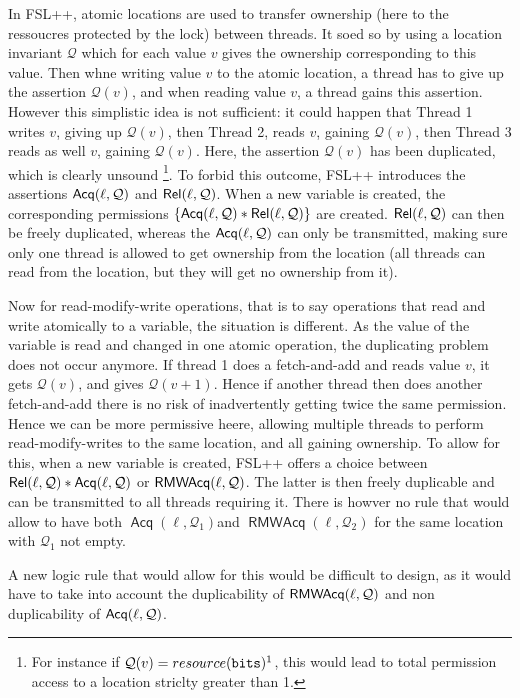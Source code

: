 In FSL++, atomic locations are used to transfer ownership (here to the ressoucres protected by the lock) between threads. It soed so by using a location invariant $\mathcal{Q}$ which for each value $v$ gives the ownership corresponding to this value. Then whne writing value $v$ to the atomic location, a thread has to give up the assertion $\mathcal{Q}(v)$, and when reading value $v$, a thread gains this assertion. However this simplistic idea is not sufficient: it could happen that Thread 1 writes $v$, giving up $\mathcal{Q}(v)$, then Thread 2, reads $v$, gaining $\mathcal{Q}(v)$, then Thread 3 reads as well $v$, gaining $\mathcal{Q}(v)$. Here, the assertion $\mathcal{Q}(v)$ has been duplicated, which is clearly unsound \footnote{For instance if $\mathcal{Q}(v) = resource(\texttt{bits})^{1}$, this would lead to total permission access to a location striclty greater than 1.}. To forbid this outcome, FSL++ introduces the assertions $\operatorname{\mathsf{Acq}}(\ell, \mathcal{Q})$ and $\operatorname{\mathsf{Rel}}(\ell, \mathcal{Q})$. When a new variable is created, the corresponding permissions $\{\operatorname{\mathsf{Acq}}(\ell, \mathcal{Q}) * \operatorname{\mathsf{Rel}}(\ell, \mathcal{Q})\}$ are created. $\operatorname{\mathsf{Rel}}(\ell, \mathcal{Q})$ can then be freely duplicated, whereas the $\operatorname{\mathsf{Acq}}(\ell, \mathcal{Q})$ can only be transmitted, making sure only one thread is allowed to get ownership from the location (all threads can read from the location, but they will get no ownership from it). 

Now for read-modify-write operations, that is to say operations that read and write atomically to a variable, the situation is different. As the value of the variable is read and changed in one atomic operation, the duplicating problem does not occur anymore. If thread 1 does a fetch-and-add and reads value $v$, it gets $\mathcal{Q}(v)$, and gives $\mathcal{Q}(v + 1)$. Hence if another thread then does another fetch-and-add there is no risk of inadvertently getting twice the same permission. Hence we can be more permissive heere, allowing multiple threads to perform read-modify-writes to the same location, and all gaining ownership. To allow for this, when a new variable is created, FSL++ offers a choice between $\operatorname{\mathsf{Rel}}(\ell, \mathcal{Q}) * \operatorname{\mathsf{Acq}}(\ell, \mathcal{Q})$ or $\operatorname{\mathsf{RMWAcq}}(\ell, \mathcal{Q})$. The latter is then freely duplicable and can be transmitted to all threads requiring it. There is howver no rule that would allow to have both $\operatorname{\mathsf{Acq}}(\ell, \mathcal{Q_1})$and $\operatorname{\mathsf{RMWAcq}}(\ell, \mathcal{Q_2})$ for the same location with $\mathcal{Q}_1$ not empty.

A new logic rule that would allow for this would be difficult to design, as it would have to take into account the duplicability of $\operatorname{\mathsf{RMWAcq}}(\ell, \mathcal{Q})$ and non duplicability of $\operatorname{\mathsf{Acq}}(\ell, \mathcal{Q})$.

